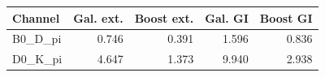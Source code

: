\begin{tabular}{lrrrr}
\toprule
Channel & Gal. ext. & Boost ext. & Gal. GI & Boost GI \\
\midrule
B0\_D\_pi & 0.746 & 0.391 & 1.596 & 0.836 \\
D0\_K\_pi & 4.647 & 1.373 & 9.940 & 2.938 \\
\bottomrule
\end{tabular}
